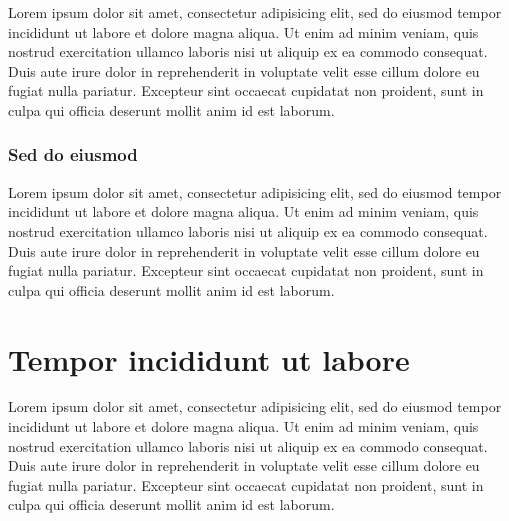 \documentclass{thesis_proposal}
\begin{document}
Lorem ipsum dolor sit amet, consectetur adipisicing elit, sed do
eiusmod tempor incididunt ut labore et dolore magna aliqua. Ut enim ad
minim veniam, quis nostrud exercitation ullamco laboris nisi ut
aliquip ex ea commodo consequat. Duis aute irure dolor in
reprehenderit in voluptate velit esse cillum dolore eu fugiat nulla
pariatur. Excepteur sint occaecat cupidatat non proident, sunt in
culpa qui officia deserunt mollit anim id est laborum.

\subsubsection{Sed do eiusmod}

Lorem ipsum dolor sit amet, consectetur adipisicing elit, sed do
eiusmod tempor incididunt ut labore et dolore magna aliqua. Ut enim ad
minim veniam, quis nostrud exercitation ullamco laboris nisi ut
aliquip ex ea commodo consequat. Duis aute irure dolor in
reprehenderit in voluptate velit esse cillum dolore eu fugiat nulla
pariatur. Excepteur sint occaecat cupidatat non proident, sunt in
culpa qui officia deserunt mollit anim id est laborum.



\backmatter                     %
\appendix
\section{Tempor incididunt ut labore}

Lorem ipsum dolor sit amet, consectetur adipisicing elit, sed do
eiusmod tempor incididunt ut labore et dolore magna aliqua. Ut enim ad
minim veniam, quis nostrud exercitation ullamco laboris nisi ut
aliquip ex ea commodo consequat. Duis aute irure dolor in
reprehenderit in voluptate velit esse cillum dolore eu fugiat nulla
pariatur. Excepteur sint occaecat cupidatat non proident, sunt in
culpa qui officia deserunt mollit anim id est laborum.




\end{document}
